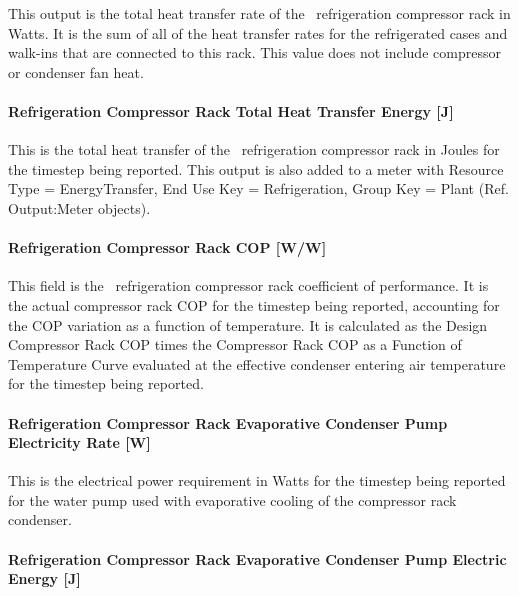 This output is the total heat transfer rate of the~ refrigeration compressor rack in Watts. It is the sum of all of the heat transfer rates for the refrigerated cases and walk-ins that are connected to this rack. This value does not include compressor or condenser fan heat.

\paragraph{Refrigeration Compressor Rack Total Heat Transfer Energy {[}J{]}}\label{refrigeration-compressor-rack-total-heat-transfer-energy-j}

This is the total heat transfer of the~ refrigeration compressor rack in Joules for the timestep being reported. This output is also added to a meter with Resource Type = EnergyTransfer, End Use Key = Refrigeration, Group Key = Plant (Ref. Output:Meter objects).

\paragraph{Refrigeration Compressor Rack COP {[}W/W{]}}\label{refrigeration-compressor-rack-cop-ww}

This field is the~ refrigeration compressor rack coefficient of performance. It is the actual compressor rack COP for the timestep being reported, accounting for the COP variation as a function of temperature. It is calculated as the Design Compressor Rack COP times the Compressor Rack COP as a Function of Temperature Curve evaluated at the effective condenser entering air temperature for the timestep being reported.

\paragraph{Refrigeration Compressor Rack Evaporative Condenser Pump Electricity Rate {[}W{]}}\label{refrigeration-compressor-rack-evaporative-condenser-pump-electric-power-w}

This is the electrical power requirement in Watts for the timestep being reported for the water pump used with evaporative cooling of the compressor rack condenser.

\paragraph{Refrigeration Compressor Rack Evaporative Condenser Pump Electric Energy {[}J{]}}\label{refrigeration-compressor-rack-evaporative-condenser-pump-electric-energy-j}

